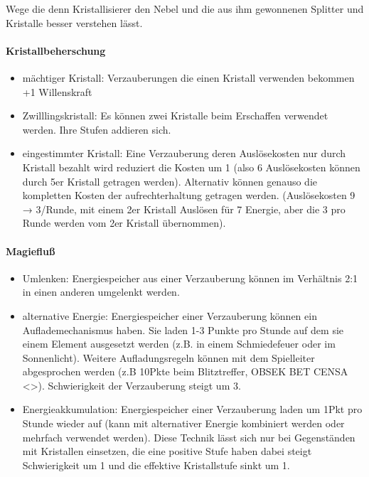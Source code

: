 \documentclass{article}
\begin{document}
Wege die denn Kristallisierer den Nebel und die aus ihm gewonnenen Splitter und Kristalle besser verstehen lässt.

\paragraph{Kristallbeherschung}

\begin{itemize}
\item mächtiger Kristall: Verzauberungen die einen Kristall verwenden bekommen +1 Willenskraft
\item Zwilllingskristall: Es können zwei Kristalle beim Erschaffen verwendet werden. Ihre Stufen addieren sich.
\item eingestimmter Kristall: Eine Verzauberung deren Auslösekosten nur durch Kristall bezahlt wird reduziert die Kosten um 1 (also 6 Auslösekosten können durch 5er Kristall getragen werden). Alternativ können genauso die kompletten Kosten der aufrechterhaltung getragen werden. (Auslösekosten 9 → 3/Runde, mit einem 2er Kristall Auslösen für 7 Energie, aber die 3 pro Runde werden vom 2er Kristall übernommen).
\end{itemize}

\paragraph{Magiefluß}

\begin{itemize}
\item Umlenken: Energiespeicher aus einer Verzauberung können im Verhältnis 2:1 in einen anderen umgelenkt werden.
\item alternative Energie: Energiespeicher einer Verzauberung können ein Auflademechanismus haben. Sie laden 1-3 Punkte pro Stunde auf dem sie einem Element ausgesetzt werden (z.B. in einem Schmiedefeuer oder im Sonnenlicht). Weitere Aufladungsregeln können mit dem Spielleiter abgesprochen werden (z.B 10Pkte beim Blitztreffer, OBSEK BET CENSA <>). Schwierigkeit der Verzauberung steigt um 3.
\item Energieakkumulation: Energiespeicher einer Verzauberung laden um 1Pkt pro Stunde wieder auf (kann mit alternativer Energie kombiniert werden oder mehrfach verwendet werden). Diese Technik lässt sich nur bei Gegenständen mit Kristallen einsetzen, die eine positive Stufe haben dabei steigt Schwierigkeit um 1 und die effektive Kristallstufe sinkt um 1.
\end{itemize}
\end{document}
